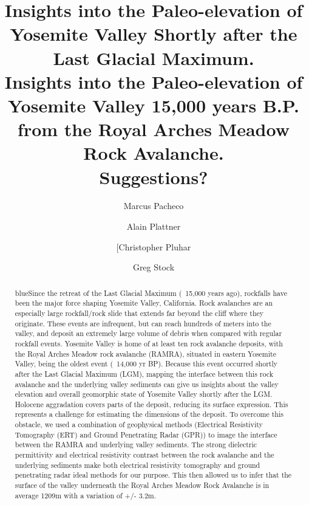 \documentclass[5p]{elsarticle}
\newcommand{\COMON}{\begin{color}{blue}}
\newcommand{\COMOFF}{\end{color}}
\begin{document}
	\begin{frontmatter}

\title{Insights into the Paleo-elevation of Yosemite Valley Shortly after the Last Glacial Maximum.\\ \vspace{1cm}Insights into the Paleo-elevation of Yosemite Valley 15,000 years B.P. from the Royal Arches Meadow Rock Avalanche.\\ \vspace{1cm}Suggestions?}

\author[Marcus]{Marcus Pacheco}
\address[Marcus]{California State University, Fresno}

\author[Alain]{Alain Plattner}
\address[Alain]{University of Alabama}

\author[Chris]{[Christopher Pluhar}
\address[Chris]{California State University, Fresno}

\author[Greg]{Greg Stock}
\address[Greg]{Yosemite National Park}



										\begin{abstract}
										
\COMON Since the retreat of the Last Glacial Maximum (~15,000 years ago), rockfalls have been the major force shaping Yosemite Valley, California. Rock avalanches are an especially large rockfall/rock slide that extends far beyond the cliff where they originate. These events are infrequent, but can reach hundreds of meters into the valley, and deposit an extremely large volume of debris when compared with regular rockfall events. Yosemite Valley is home of at least ten rock avalanche deposits, with the Royal Arches Meadow rock avalanche (RAMRA), situated in eastern Yosemite Valley, being the oldest event (~14,000 yr BP). Because this event occurred shortly after the Last Glacial Maximum (LGM), mapping the interface between this rock avalanche and the underlying valley sediments can give us insights about the valley elevation and overall geomorphic state of Yosemite Valley shortly after the LGM.  Holocene aggradation covers parts of the deposit, reducing its surface expression. This represents a challenge for estimating the dimensions of the deposit. To overcome this obstacle, we used a combination of geophysical methods (Electrical Resistivity Tomography (ERT) and Ground Penetrating Radar (GPR)) to image the interface between the RAMRA and underlying valley sediments. The strong dielectric permittivity and electrical resistivity contrast between the rock avalanche and the underlying sediments make both electrical resistivity tomography and ground penetrating radar ideal methods for our purpose. This then allowed us to infer that the surface of the valley underneath the Royal Arches Meadow Rock Avalanche is in average 1209m with a variation of +/- 3.2m.\COMOFF


\end{abstract}
\end{frontmatter}
\end{document}
